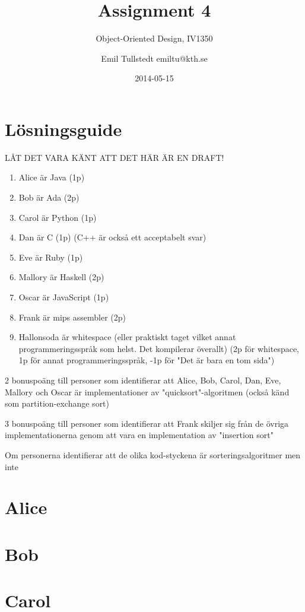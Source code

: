 \documentclass[a4paper]{scrreprt}
\title{Assignment 4}
\subtitle{Object-Oriented Design, IV1350}
\author{Emil Tullstedt emiltu@kth.se}
\date{2014-05-15}
\begin{document}
\chapter{Lösningsguide}

LÅT DET VARA KÄNT ATT DET HÄR ÄR EN DRAFT!

\begin{enumerate}
\item Alice är Java (1p)
\item Bob är Ada (2p)
\item Carol är Python (1p)
\item Dan är C (1p) (C++ är också ett acceptabelt svar)
\item Eve är Ruby (1p)
\item Mallory är Haskell (2p)
\item Oscar är JavaScript (1p)
\item Frank är mips assembler (2p)
\item Hallonsoda är whitespace (eller praktiskt taget vilket annat programmeringsspråk som helst. Det kompilerar överallt) (2p för whitespace, 1p för annat programmeringsspråk, -1p för "Det är bara en tom sida") 
\end{enumerate}

2 bonuspoäng till personer som identifierar att Alice, Bob, Carol, Dan, Eve, Mallory och Oscar är implementationer av "quicksort"-algoritmen (också känd som partition-exchange sort)

3 bonuspoäng till personer som identifierar att Frank skiljer sig från de övriga implementationerna genom att vara en implementation av "insertion sort"

Om personerna identifierar att de olika kod-styckena är sorteringsalgoritmer men inte 

\chapter{Alice}



\chapter{Bob}



\chapter{Carol}
\end{document}
